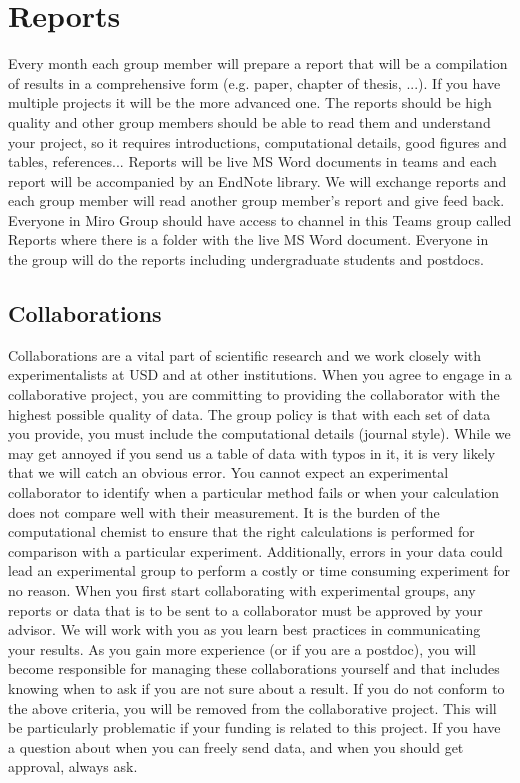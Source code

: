 \documentclass[letterpaper]{article}
\begin{document}
\section*{Reports}
Every month each group member will prepare a report that will be a compilation of results in a comprehensive form (e.g. paper, chapter of thesis, ...). If you have multiple projects it will be the more advanced one. The reports should be high quality and other group members should be able to read them and understand your project, so it requires introductions, computational details, good figures and tables, references... Reports will be live MS Word documents in teams and each report will be accompanied by an EndNote library. We will exchange reports and each group member will read another group member's report and give feed back. Everyone in Miro Group should have access to channel in this Teams group called Reports where there is a folder with the live MS Word document. Everyone in the group will do the reports including undergraduate students and postdocs. 

\subsection*{Collaborations}
Collaborations are a vital part of scientific research and we work closely with experimentalists at USD and at other institutions. When you agree to engage in a collaborative project, you are committing to providing the collaborator with the highest possible quality of data. The group policy is that with each set of data you provide, you must include the computational details (journal style). While we may get annoyed if you send us a table of data with typos in it, it is very likely that we will catch an obvious error. You cannot expect an experimental collaborator to identify when a particular method fails or when your calculation does not compare well with their measurement. It is the burden of the computational chemist to ensure that the right calculations is performed for comparison with a particular experiment. Additionally, errors in your data could lead an experimental group to perform a costly or time consuming experiment for no reason. When you first start collaborating with experimental groups, any reports or data that is to be sent to a collaborator must be approved by your advisor. We will work with you as you learn best practices in communicating your results. As you gain more experience (or if you are a postdoc), you will become responsible for managing these collaborations yourself and that includes knowing when to ask if you are not sure about a result. If you do not conform to the above criteria, you will be removed from the collaborative project. This will be particularly problematic if your funding is related to this project. If you have a question about when you can freely send data, and when you should get approval, always ask.
\end{document}
